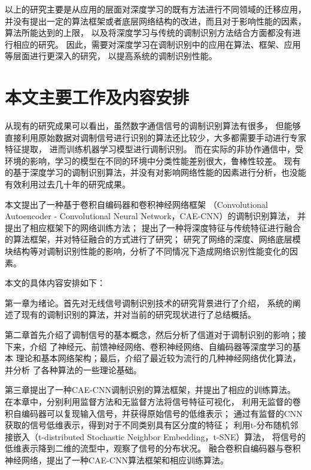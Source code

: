 以上的研究主要是从应用的层面对深度学习的既有方法进行不同领域的迁移应用，
并没有提出一定的算法框架或者底层网络结构的改进，而且对于影响性能的因素，算法所能达到的上限，
以及将深度学习与传统的调制识别方法结合方面都没有进行相应的研究。
因此，需要对深度学习在调制识别中的应用在算法、框架、应用等层面进行更深入的研究，
以提高系统的调制识别性能。\par

\section{本文主要工作及内容安排}
从现有的研究成果可以看出，虽然数字通信信号的调制识别算法有很多，
但能够直接利用原始数据对调制信号进行识别的算法还比较少，大多都需要手动进行专家特征提取，
进而训练机器学习模型进行调制识别。
而在实际的非协作通信中，受环境的影响，学习的模型在不同的环境中分类性能差别很大，鲁棒性较差。
现有的基于深度学习的调制识别算法，并没有对影响网络性能的因素进行分析，也没能有效利用过去几十年的研究成果。\par

本文提出了一种基于卷积自编码器和卷积神经网络框架
（Convolutional Autoencoder - Convolutional Neural Network，CAE-CNN）的调制识别算法，
并提出了相应框架下的网络训练方法；
提出了一种将深度特征与传统特征进行融合的算法框架，并对特征融合的方式进行了研究；
研究了网络的深度、网络底层模块结构等对调制识别性能的影响，分析了不同情况下造成网络识别性能变化的因素。 \par

本文的具体内容安排如下：

第一章为绪论。首先对无线信号调制识别技术的研究背景进行了介绍，
系统的阐述了现有的调制识别的算法，并对当前的研究现状进行了总结概括。\par

第二章首先介绍了调制信号的基本概念，然后分析了信道对于调制识别的影响；接下来，介绍
了神经元、前馈神经网络、卷积神经网络、自编码器等深度学习的基本
理论和基本网络架构；最后，介绍了最近较为流行的几种神经网络优化算法，并分析
了各种算法的一些理论基础。 \par

第三章提出了一种CAE-CNN调制识别的算法框架，并提出了相应的训练算法。
在本章中，分别利用监督方法和无监督方法将信号特征可视化，
利用无监督的卷积自编码器可以复现输入信号，并获得原始信号的低维表示；
通过有监督的CNN获取的信号低维表示，得到对于不同类别具有区分度的特征；
利用t-分布随机邻接嵌入（t-distributed Stochastic Neighbor Embedding，t-SNE）算法，
将信号的低维表示降到二维的流型中，观察了信号的分布状况。
融合卷积自编码器与卷积神经网络，提出了一种CAE-CNN算法框架和相应训练算法。\par

